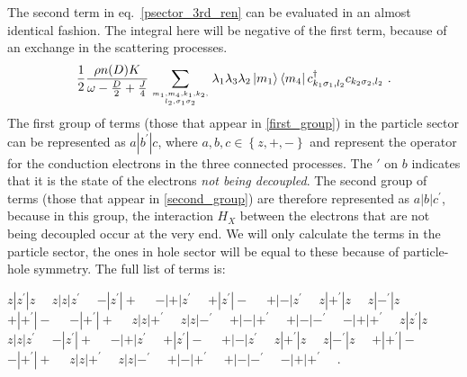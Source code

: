\documentclass[12pt]{iopart}
\begin{document}
The second term in eq.~\ref{psector_3rd_ren} can be evaluated in an almost identical fashion. The integral here will be negative of the first term, because of an exchange in the scattering processes.
\begin{eqnarray}
	\label{second_group}
	\frac{1}{2}\frac{\rho n(D) K}{\omega - \frac{D}{2} + \frac{J}{4}}\sum_{m_1,m_4,k_1,k_2,\atop{l_2,\sigma_1\sigma_2}}\lambda_{1}\lambda_{3}\lambda_{2}\ket{m_1}\bra{m_4}c^\dagger_{k_1 \sigma_1, l_2}c_{k_2 \sigma_2,l_2}~.
\end{eqnarray}
The first group of terms (those that appear in \ref{first_group}) in the particle sector can be represented as \(a|b^\prime|c\), where \(a,b,c \in \left\{z,+,-\right\} \) and represent the operator for the conduction electrons in the three connected processes. The \(\prime\) on \(b\) indicates that it is the state of the electrons \textit{not being decoupled}. The second group of terms (those that appear in \ref{second_group}) are therefore represented as \(a|b|c^\prime\), because in this group, the interaction \(H_X\) between the electrons that are not being decoupled occur at the very end.
We will only calculate the terms in the particle sector, the ones in hole sector will be equal to these because of particle-hole symmetry. The full list of terms is: 


$z|z^\prime|z\quad$
$z|z|z^\prime\quad$
$-|z^\prime|+\quad$
$-|+|z^\prime\quad$
$+|z^\prime|-\quad$
$+|-|z^\prime\quad$
$ z|+^\prime|z\quad$
$z|-^\prime|z\quad$
$+|+^\prime|-\quad$
$-|+^\prime|+\quad$
$z|z|+^\prime\quad$
$z|z|-^\prime\quad$
$ +|-|+^\prime\quad$
$+|-|-^\prime\quad$
$-|+|+^\prime\quad$
$z|z^\prime|z\quad$
$z|z|z^\prime\quad$
$-|z^\prime|+\quad$
$ -|+|z^\prime\quad$
$+|z^\prime|-\quad$
$+|-|z^\prime\quad$
$z|+^\prime|z\quad$
$z|-^\prime|z\quad$
$+|+^\prime|-\quad$
$-|+^\prime|+\quad$
$z|z|+^\prime\quad$
$z|z|-^\prime\quad$
$+|-|+^\prime\quad$
$+|-|-^\prime\quad$
$-|+|+^\prime\quad$
.
\end{document}
